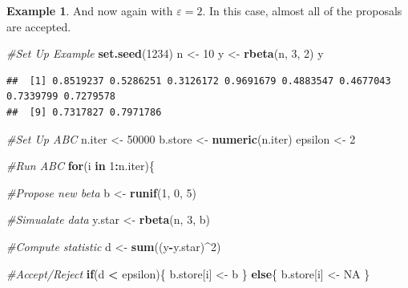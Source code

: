 \documentclass[
]{book}
\newenvironment{Shaded}{\begin{snugshade}}{\end{snugshade}}
\newcommand{\CommentTok}[1]{\textcolor[rgb]{0.56,0.35,0.01}{\textit{#1}}}
\newcommand{\ConstantTok}[1]{\textcolor[rgb]{0.56,0.35,0.01}{#1}}
\newcommand{\ControlFlowTok}[1]{\textcolor[rgb]{0.13,0.29,0.53}{\textbf{#1}}}
\newcommand{\DecValTok}[1]{\textcolor[rgb]{0.00,0.00,0.81}{#1}}
\newcommand{\FunctionTok}[1]{\textcolor[rgb]{0.13,0.29,0.53}{\textbf{#1}}}
\newcommand{\NormalTok}[1]{#1}
\newcommand{\OtherTok}[1]{\textcolor[rgb]{0.56,0.35,0.01}{#1}}
\newcommand{\SpecialCharTok}[1]{\textcolor[rgb]{0.81,0.36,0.00}{\textbf{#1}}}
\theoremstyle{definition}
\theoremstyle{definition}
\newtheorem{example}{Example}[chapter]
\theoremstyle{definition}
\theoremstyle{definition}
\theoremstyle{remark}
\begin{document}
\begin{example}
And now again with \(\varepsilon = 2\). In this case, almost all of the proposals are accepted.

\begin{Shaded}
\begin{Highlighting}[]
\CommentTok{\#Set Up Example}
\FunctionTok{set.seed}\NormalTok{(}\DecValTok{1234}\NormalTok{)}
\NormalTok{n }\OtherTok{\textless{}{-}} \DecValTok{10}
\NormalTok{y }\OtherTok{\textless{}{-}} \FunctionTok{rbeta}\NormalTok{(n, }\DecValTok{3}\NormalTok{, }\DecValTok{2}\NormalTok{)}
\NormalTok{y}
\end{Highlighting}
\end{Shaded}

\begin{verbatim}
##  [1] 0.8519237 0.5286251 0.3126172 0.9691679 0.4883547 0.4677043 0.7339799 0.7279578
##  [9] 0.7317827 0.7971786
\end{verbatim}

\begin{Shaded}
\begin{Highlighting}[]
\CommentTok{\#Set Up ABC}
\NormalTok{n.iter }\OtherTok{\textless{}{-}} \DecValTok{50000}
\NormalTok{b.store }\OtherTok{\textless{}{-}} \FunctionTok{numeric}\NormalTok{(n.iter)}
\NormalTok{epsilon }\OtherTok{\textless{}{-}} \DecValTok{2}

\CommentTok{\#Run ABC}
\ControlFlowTok{for}\NormalTok{(i }\ControlFlowTok{in} \DecValTok{1}\SpecialCharTok{:}\NormalTok{n.iter)\{}
  
  \CommentTok{\#Propose new beta}
\NormalTok{  b }\OtherTok{\textless{}{-}} \FunctionTok{runif}\NormalTok{(}\DecValTok{1}\NormalTok{, }\DecValTok{0}\NormalTok{, }\DecValTok{5}\NormalTok{)}
  
  \CommentTok{\#Simualate data}
\NormalTok{  y.star }\OtherTok{\textless{}{-}} \FunctionTok{rbeta}\NormalTok{(n, }\DecValTok{3}\NormalTok{, b)}
  
  \CommentTok{\#Compute statistic}
\NormalTok{  d }\OtherTok{\textless{}{-}} \FunctionTok{sum}\NormalTok{((y}\SpecialCharTok{{-}}\NormalTok{y.star)}\SpecialCharTok{\^{}}\DecValTok{2}\NormalTok{)}
  
  \CommentTok{\#Accept/Reject}
  \ControlFlowTok{if}\NormalTok{(d }\SpecialCharTok{\textless{}}\NormalTok{ epsilon)\{}
\NormalTok{    b.store[i] }\OtherTok{\textless{}{-}}\NormalTok{ b}
\NormalTok{  \} }\ControlFlowTok{else}\NormalTok{\{}
\NormalTok{    b.store[i] }\OtherTok{\textless{}{-}} \ConstantTok{NA}
\NormalTok{  \}}
  

\end{Highlighting}
\end{Shaded}
\end{example}
\end{document}
